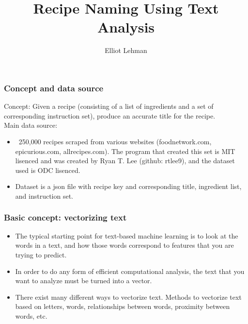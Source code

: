 \documentclass{beamer}
\title{Recipe Naming Using Text Analysis}
\author{Elliot Lehman}
\institute{UCLA Extension}
\begin{document}
\begin{frame}
\titlepage
\end{frame}


\begin{frame}
	\frametitle{Concept and data source}

	Concept: Given a recipe (consisting of a list of ingredients and a set
	of corresponding instruction set), produce an accurate title for the
	recipe.\\
	\medskip
	Main data source:
	\begin{itemize}
		\item ~250,000 recipes scraped from various websites
			(foodnetwork.com, epicurious.com, allrecipes.com). The
			program that created this set is MIT lisenced and was
			created by Ryan T. Lee (github: rtlee9), and the
			dataset used is ODC lisenced.
			
		\item Dataset is a json file with recipe key and corresponding
			title, ingredient list, and instruction set.
	\end{itemize}
\end{frame}
			

\begin{frame}
	\frametitle{Basic concept: vectorizing text}
	\begin{itemize}
		\item The typical starting point for text-based machine
			learning is to look at the words in a text, and how
			those words correspond to features that you are trying
			to predict.
		\item In order to do any form of efficient computational
			analysis, the text that you want to analyze must be
			turned into a vector. 
		\item There exist many different ways to vectorize text.
			Methods to vectorize text based on letters, words,
			relationships between words, proximity between words,
			etc.

	\end{itemize}
	\bigskip


	\noindent{}
\end{frame}
\end{document}
